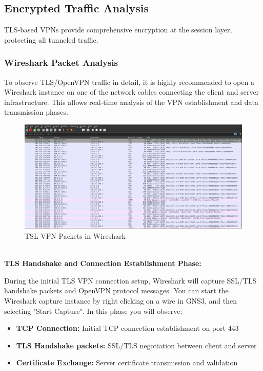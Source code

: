 \subsection{Encrypted Traffic Analysis}

TLS-based VPNs provide comprehensive encryption at the session layer, protecting all tunneled traffic.

\subsubsection{Wireshark Packet Analysis}

To observe TLS/OpenVPN traffic in detail, it is highly recommended to open a Wireshark instance on one of the network cables connecting the client and server infrastructure. This allows real-time analysis of the VPN establishment and data transmission phases.

\begin{figure}[H]
\centering
\includegraphics[width=\textwidth]{../resources/Images/TLS_Packets.png}
\caption{TSL VPN Packets in Wireshark}
\label{fig:tls_packets}
\end{figure}

\noindent
\\
\textbf{TLS Handshake and Connection Establishment Phase:}

\noindent
During the initial TLS VPN connection setup, Wireshark will capture SSL/TLS handshake packets and OpenVPN protocol messages. You can start the Wireshark capture instance by right clicking on a wire in GNS3, and then selecting "Start Capture". In this phase you will observe:

\begin{itemize}
    \item \textbf{TCP Connection:} Initial TCP connection establishment on port 443
    \item \textbf{TLS Handshake packets:} SSL/TLS negotiation between client and server
    \item \textbf{Certificate Exchange:} Server certificate transmission and validation
\end{itemize}

